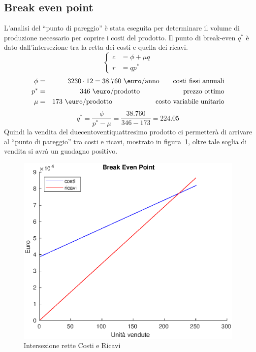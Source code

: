\subsection{Break even point}
L’analisi del “punto di pareggio” è stata eseguita per determinare il volume di
produzione necessario per coprire i costi del prodotto.  Il punto di break-even
$q^*$ è dato dall’intersezione tra la retta dei costi e quella dei ricavi. 
%
\setlength\arraycolsep{2pt}
\begin{displaymath}
\left\{ \begin{array}{rl}
c &= \phi + \mu q \\
r &= q p^* 
\end{array} \right .
\end{displaymath}
%
\begin{eqnarray*}
\phi &=& 3230 \cdot 12 = 38.760 \ \mbox{\euro/anno} \qquad \mbox{costi fissi annuali} \\
p^* &=& 346 \ \mbox{\euro/prodotto} \ \qquad\quad\qquad\quad \mbox{prezzo ottimo} \\
\mu &=& 173 \ \mbox{\euro/prodotto} \ \qquad\quad\qquad\quad \mbox{costo variabile unitario}
\end{eqnarray*}
%
\begin{displaymath}
q^* = \frac{\phi}{p^* - \mu} = \frac{38.760}{346 - 173} = 224.05
\end{displaymath}
Quindi la vendita del duecentoventiquattresimo prodotto ci permetterà di
arrivare al “punto di pareggio” tra costi e ricavi, mostrato in
figura~\ref{bep}, oltre tale soglia di vendita si avrà un guadagno positivo.
%
\begin{figure}[!h]
\centering
\includegraphics[width=\textwidth]{figures/bep}
\caption{Intersezione rette Costi e Ricavi}
\label{bep}
\end{figure}
%
